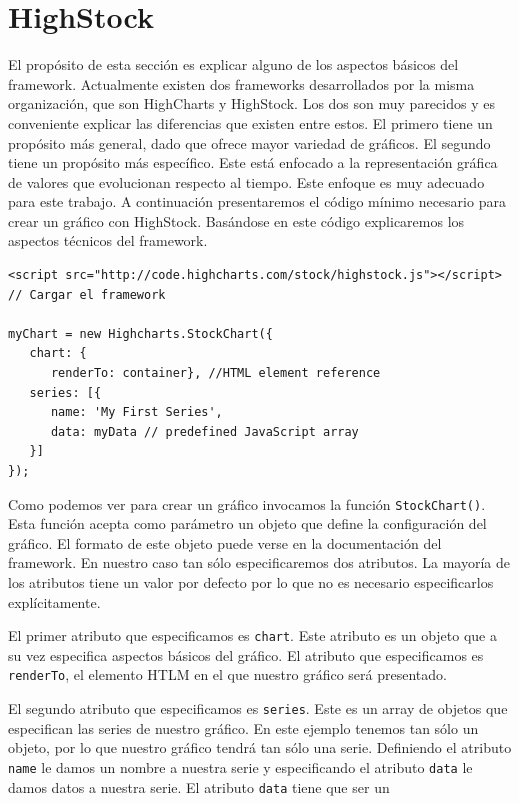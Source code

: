 \section{HighStock}
	El propósito de esta sección es explicar alguno de los aspectos básicos del framework. Actualmente existen dos frameworks desarrollados por la
	misma organización, que son HighCharts y HighStock. Los dos son muy parecidos y es conveniente explicar las diferencias que existen entre
	estos. El primero tiene un propósito más general, dado que ofrece mayor variedad de gráficos. El segundo tiene un propósito más específico.
	Este está enfocado a la representación gráfica de valores que evolucionan respecto al tiempo. Este enfoque es muy adecuado para este trabajo.
	A continuación presentaremos el código mínimo necesario para crear un gráfico con HighStock. Basándose en este código explicaremos los
	aspectos técnicos del framework.
	\begin{lstlisting}[style=myJs]
<script src="http://code.highcharts.com/stock/highstock.js"></script>  // Cargar el framework

myChart = new Highcharts.StockChart({
   chart: {
      renderTo: container}, //HTML element reference
   series: [{
      name: 'My First Series',
      data: myData // predefined JavaScript array
   }]
});
	\end{lstlisting}
	\par
	Como podemos ver para crear un gráfico invocamos la función \texttt{StockChart()}. Esta función acepta como parámetro un objeto que
	define la configuración del gráfico. El formato de este objeto puede verse en la documentación del framework\cite{HighStockDoc}. En nuestro
	caso tan sólo especificaremos dos atributos. La mayoría de los atributos tiene un valor por defecto por lo que no es necesario especificarlos
	explícitamente. 
	\par
	El primer atributo que especificamos es \texttt{chart}. Este atributo es un objeto que a su vez especifica aspectos básicos del gráfico. El
	atributo que especificamos es \texttt{renderTo}, el elemento HTLM en el que nuestro gráfico será presentado.
	\par
	El segundo atributo que especificamos es \texttt{series}. Este es un array de objetos que especifican las series de nuestro gráfico. En este
	ejemplo tenemos tan sólo un objeto, por lo que nuestro gráfico tendrá tan sólo una serie.  Definiendo el atributo \texttt{name} le damos un
	nombre a nuestra serie y especificando el atributo \texttt{data} le damos datos a nuestra serie. El atributo \texttt{data} tiene que ser un
